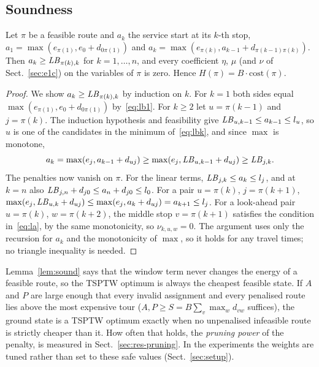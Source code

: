 \subsection{Soundness}\label{sec:soundness}
\begin{lemma}[Soundness]\label{lem:sound}
Let $\pi$ be a feasible route and $a_k$ the service start at its $k$-th stop,
$a_1 = \max(e_{\pi(1)}, e_0 + d_{0\pi(1)})$ and $a_k = \max(e_{\pi(k)}, a_{k-1} + d_{\pi(k-1)\pi(k)})$.
Then $a_k \ge \mathit{LB}_{\pi(k),k}$ for $k = 1,\dots,n$, and every coefficient
$\eta$, $\mu$ (and $\nu$ of Sect.~\ref{sec:e1c}) on the variables of $\pi$ is zero.
Hence $H(\pi) = B\cdot\mathrm{cost}(\pi)$.
\end{lemma}
\begin{proof}
We show $a_k \ge \mathit{LB}_{\pi(k),k}$ by induction on $k$. For $k=1$ both sides equal
$\max(e_{\pi(1)}, e_0 + d_{0\pi(1)})$ by~\eqref{eq:lb1}. For $k\ge2$ let $u=\pi(k-1)$ and
$j=\pi(k)$. The induction hypothesis and feasibility give $\mathit{LB}_{u,k-1} \le a_{k-1} \le l_u$, so
$u$ is one of the candidates in the minimum of~\eqref{eq:lbk}, and since $\max$ is monotone,
\[ a_k = \max(e_j, a_{k-1} + d_{uj}) \ge \max(e_j, \mathit{LB}_{u,k-1} + d_{uj}) \ge \mathit{LB}_{j,k}. \]
The penalties now vanish on $\pi$. For the linear terms, $\mathit{LB}_{j,k} \le a_k \le l_j$, and at
$k=n$ also $\mathit{LB}_{j,n} + d_{j0} \le a_n + d_{j0} \le l_0$. For a pair $u=\pi(k)$, $j=\pi(k+1)$,
$\max(e_j, \mathit{LB}_{u,k} + d_{uj}) \le \max(e_j, a_k + d_{uj}) = a_{k+1} \le l_j$. For a look-ahead
pair $u=\pi(k)$, $w=\pi(k+2)$, the middle stop $v=\pi(k+1)$ satisfies the condition
in~\eqref{eq:la}, by the same monotonicity, so $\nu_{k,u,w}=0$. The argument uses only the
recursion for $a_k$ and the monotonicity of $\max$, so it holds for any travel times; no triangle
inequality is needed.
\end{proof}
Lemma~\ref{lem:sound} says that the window term never changes the energy of a feasible route, so
the TSPTW optimum is always the cheapest feasible state. If $A$ and $P$ are large enough that
every invalid assignment and every penalised route lies above the most expensive tour
($A, P \ge S = B\sum_v \max_w d_{vw}$ suffices), the ground state is a TSPTW optimum exactly when
no unpenalised infeasible route is strictly cheaper than it. How often that holds, the
\emph{pruning power} of the penalty, is measured in Sect.~\ref{sec:res-pruning}. In the
experiments the weights are tuned rather than set to these safe values (Sect.~\ref{sec:setup}).

